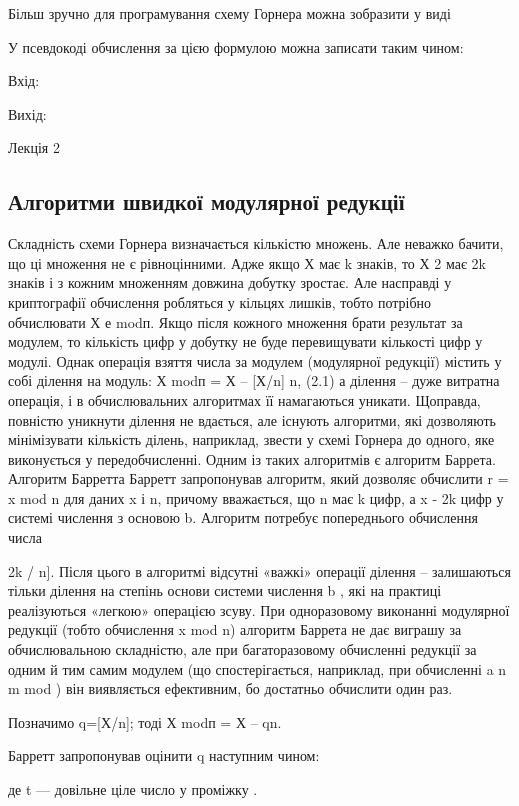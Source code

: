 Більш зручно для програмування схему Горнера можна зобразити у виді


У псевдокоді обчислення за цією формулою можна записати таким чином:

Вхід: 

Вихід: 


Лекція 2

\subsection{Алгоритми швидкої модулярної редукції}

Складність схеми Горнера визначається кількістю множень. Але неважко
бачити, що ці множення не є рівноцінними. Адже якщо Х має k знаків, то Х 2
має 2k знаків і з кожним множенням довжина добутку зростає. Але насправді у
криптографії обчислення робляться у кільцях лишків, тобто потрібно
обчислювати Х
е modп. Якщо після кожного множення брати результат за
модулем, то кількість цифр у добутку не буде перевищувати кількості цифр у
модулі. Однак операція взяття числа за модулем (модулярної редукції) містить
у собі ділення на модуль:
Х modп = Х – [Х/n] n, (2.1)
а ділення – дуже витратна операція, і в обчислювальних алгоритмах її
намагаються уникати. Щоправда, повністю уникнути ділення не вдається, але
існують алгоритми, які дозволяють мінімізувати кількість ділень, наприклад,
звести у схемі Горнера до одного, яке виконується у передобчисленні. Одним із
таких алгоритмів є алгоритм Баррета.
Алгоритм Барретта
Барретт запропонував алгоритм, який дозволяє обчислити r = x mod n для
даних x і n, причому вважається, що n має k цифр, а
x - 2k
цифр у системі
числення з основою b. Алгоритм потребує попереднього обчислення числа

2k
/ n]. Після цього в алгоритмі відсутні «важкі» операції ділення –
залишаються тільки ділення на степінь основи системи числення
b
, які на
практиці реалізуються «легкою» операцією зсуву. При одноразовому виконанні
модулярної редукції (тобто обчислення x mod n) алгоритм Баррета не дає
виграшу за обчислювальною складністю, але при багаторазовому обчисленні
редукції за одним й тим самим модулем (що спостерігається, наприклад, при 
обчисленні
a n
m mod
) він виявляється ефективним, бо  достатньо обчислити
один раз.

Позначимо q=[Х/n]; тоді Х modп = Х – qn.

Барретт запропонував оцінити q наступним чином:

де t --- довільне ціле число у проміжку .

